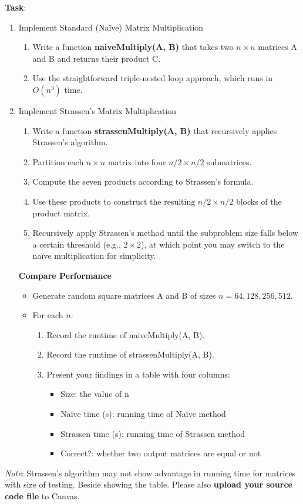 \documentclass[12pt]{article}
\begin{document}
\textbf{Task}:
\begin{enumerate}
    \item Implement Standard (Naïve) Matrix Multiplication
    \begin{enumerate}[label=(\alph*)]
        \item Write a function \textbf{naiveMultiply(A, B)} that takes two $n\times n$ matrices A and B and returns their product C.
        \item Use the straightforward triple‐nested loop approach, which runs in $O(n^3)$ time.
    \end{enumerate}
   \item Implement Strassen’s Matrix Multiplication
   \begin{enumerate}[label=(\alph*)]
       \item Write a function \textbf{strassenMultiply(A, B)} that recursively applies Strassen’s algorithm.
       \item Partition each $n \times n$ matrix into four $n/2 \times n/2$ submatrices.
       \item Compute the seven products according to Strassen’s formula.
       \item Use these products to construct the resulting $n/2 \times n/2$ blocks of the product matrix.
       \item Recursively apply Strassen’s method until the subproblem size falls below a certain threshold (e.g., $2 \times 2$), at which point you may switch to the naïve multiplication for simplicity.
   \end{enumerate}

\textbf{Compare Performance}
\begin{itemize}
    \item Generate random square matrices A and B of sizes $n=64,128,256,512$.
    \item For each $n$:
    \begin{enumerate}
        \item Record the runtime of naiveMultiply(A, B).
        \item Record the runtime of strassenMultiply(A, B).
        \item Present your findings in a table with four columns:
        \begin{itemize}
            \item Size: the value of n
            \item Naïve time (s): running time of Naïve method
            \item Strassen time (s): running time of Strassen method
            \item Correct?: whether two output matrices are equal or not
        \end{itemize}
    \end{enumerate}
\end{itemize}
\end{enumerate}
\textit{Note}: Strassen's algorithm may not show advantage in running time for matrices with size of testing. Beside showing the table. Please also \textbf{upload your source code file} to Canvas.
\end{document}
